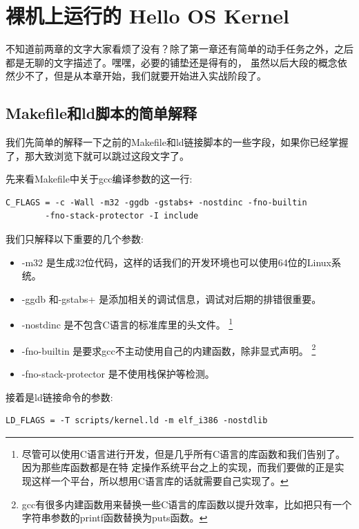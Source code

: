 
\section{裸机上运行的 Hello OS Kernel}

\par 不知道前两章的文字大家看烦了没有？除了第一章还有简单的动手任务之外，之后都是无聊的文字描述了。嘿嘿，必要的铺垫还是得有的，\allowbreak
虽然以后大段的概念依然少不了，但是从本章开始，我们就要开始进入实战阶段了。

\subsection{Makefile和ld脚本的简单解释}

\par 我们先简单的解释一下之前的Makefile和ld链接脚本的一些字段，如果你已经掌握了，那大致浏览下就可以跳过这段文字了。

\par 先来看Makefile中关于gcc编译参数的这一行:

\begin{Verbatim}[frame=single]
  C_FLAGS = -c -Wall -m32 -ggdb -gstabs+ -nostdinc -fno-builtin
		-fno-stack-protector -I include
\end{Verbatim}

\par 我们只解释以下重要的几个参数:
\begin{itemize}
	\item -m32 是生成32位代码，这样的话我们的开发环境也可以使用64位的Linux系统。
	\item -ggdb 和-gstabs+ 是添加相关的调试信息，调试对后期的排错很重要。
	\item -nostdinc 是不包含C语言的标准库里的头文件。\allowbreak
		\footnote{尽管可以使用C语言进行开发，但是几乎所有C语言的库函数和我们告别了。因为那些库函数都是在特\allowbreak
		定操作系统平台之上的实现，而我们要做的正是实现这样一个平台，所以想用C语言库的话就需要自己实现了。}
	\item -fno-builtin 是要求gcc不主动使用自己的内建函数，除非显式声明。
		\footnote{gcc有很多内建函数用来替换一些C语言的库函数以提升效率，比如把只有一个字符串参数的printf函数替换为puts函数。}
	\item -fno-stack-protector 是不使用栈保护等检测。
\end{itemize}

\par 接着是ld链接命令的参数:
\begin{Verbatim}[frame=single]
  LD_FLAGS = -T scripts/kernel.ld -m elf_i386 -nostdlib
\end{Verbatim}

